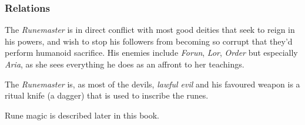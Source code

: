 \subsubsection*{Relations}

The \emph{Runemaster} is in direct conflict with most good deities that seek
to reign in his powers, and wish to stop his followers from becoming so corrupt
that they'd perform humanoid sacrifice. His enemies include \emph{Forun},
\emph{Lor}, \emph{Order} but especially \emph{Aria}, as she sees everything he
does as an affront to her teachings.

\begin{35e}
  The \emph{Runemaster} is, as most of the devils, \emph{lawful evil} and his
  favoured weapon is a ritual knife (a dagger) that is used to inscribe the
  runes.

  Rune magic is described later in this book.
\end{35e}
